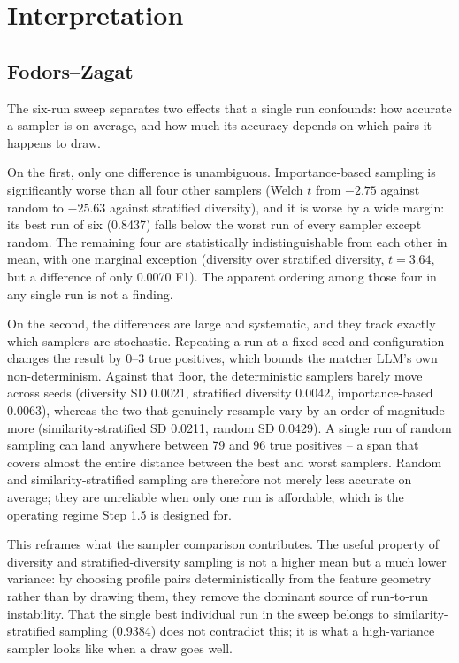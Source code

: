 \documentclass[11pt]{article}
\begin{document}
\section{Interpretation}

\subsection{Fodors--Zagat}

The six-run sweep separates two effects that a single run confounds: how accurate a
sampler is on average, and how much its accuracy depends on which pairs it happens
to draw.

On the first, only one difference is unambiguous. Importance-based sampling is
significantly worse than all four other samplers (Welch $t$ from $-2.75$ against
random to $-25.63$ against stratified diversity), and it is worse by a wide margin:
its best run of six (0.8437) falls below the worst run of every sampler except
random. The remaining four are statistically indistinguishable from each other in
mean, with one marginal exception (diversity over stratified diversity, $t = 3.64$,
but a difference of only 0.0070 F1). The apparent ordering among those four in any
single run is not a finding.

On the second, the differences are large and systematic, and they track exactly
which samplers are stochastic. Repeating a run at a fixed seed and configuration
changes the result by 0--3 true positives, which bounds the matcher LLM's own
non-determinism. Against that floor, the deterministic samplers barely move across
seeds (diversity SD 0.0021, stratified diversity 0.0042, importance-based 0.0063),
whereas the two that genuinely resample vary by an order of magnitude more
(similarity-stratified SD 0.0211, random SD 0.0429). A single run of random
sampling can land anywhere between 79 and 96 true positives -- a span that covers
almost the entire distance between the best and worst samplers. Random and
similarity-stratified sampling are therefore not merely less accurate on average;
they are unreliable when only one run is affordable, which is the operating regime
Step 1.5 is designed for.

This reframes what the sampler comparison contributes. The useful property of
diversity and stratified-diversity sampling is not a higher mean but a much lower
variance: by choosing profile pairs deterministically from the feature geometry
rather than by drawing them, they remove the dominant source of run-to-run
instability. That the single best individual run in the sweep belongs to
similarity-stratified sampling (0.9384) does not contradict this; it is what a
high-variance sampler looks like when a draw goes well.
\end{document}
